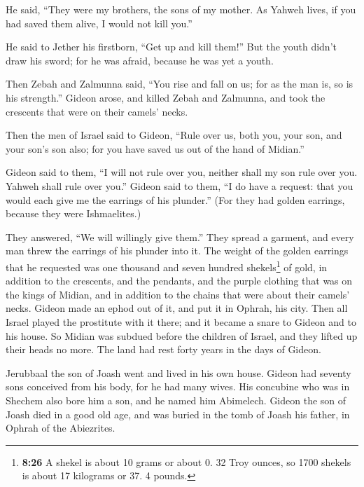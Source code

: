  He said, ``They were my brothers, the sons of my mother.
As Yahweh lives, if you had saved them alive, I would not kill you.''

 He said to Jether his firstborn, ``Get up and kill
them!'' But the youth didn't draw his sword; for he was afraid, because
he was yet a youth.

 Then Zebah and Zalmunna said, ``You rise and fall on us;
for as the man is, so is his strength.'' Gideon arose, and killed Zebah
and Zalmunna, and took the crescents that were on their camels' necks.

 Then the men of Israel said to Gideon, ``Rule over us,
both you, your son, and your son's son also; for you have saved us out
of the hand of Midian.''

 Gideon said to them, ``I will not rule over you, neither
shall my son rule over you. Yahweh shall rule over you.''
 Gideon said to them, ``I do have a request: that you
would each give me the earrings of his plunder.'' (For they had golden
earrings, because they were Ishmaelites.)

 They answered, ``We will willingly give them.'' They
spread a garment, and every man threw the earrings of his plunder into
it.  The weight of the golden earrings that he requested
was one thousand and seven hundred shekels\footnote{\textbf{8:26} A
  shekel is about 10 grams or about 0. 32 Troy ounces, so 1700 shekels
  is about 17 kilograms or 37. 4 pounds.} of gold, in addition to the
crescents, and the pendants, and the purple clothing that was on the
kings of Midian, and in addition to the chains that were about their
camels' necks.  Gideon made an ephod out of it, and put
it in Ophrah, his city. Then all Israel played the prostitute with it
there; and it became a snare to Gideon and to his house. 
So Midian was subdued before the children of Israel, and they lifted up
their heads no more. The land had rest forty years in the days of
Gideon.

 Jerubbaal the son of Joash went and lived in his own
house.  Gideon had seventy sons conceived from his body,
for he had many wives.  His concubine who was in Shechem
also bore him a son, and he named him Abimelech.  Gideon
the son of Joash died in a good old age, and was buried in the tomb of
Joash his father, in Ophrah of the Abiezrites.

